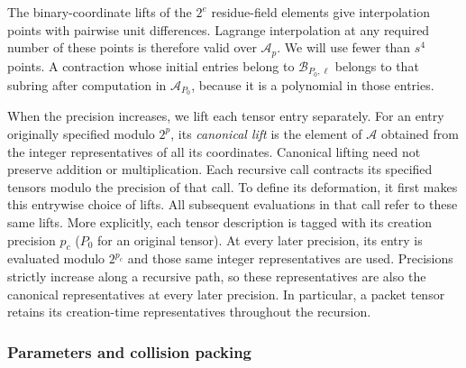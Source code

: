 The binary-coordinate lifts of the $2^e$ residue-field elements give
interpolation points with pairwise unit differences.  Lagrange
interpolation at any required number of these points is therefore
valid over $\mathcal A_p$.  We will use fewer than $s^4$ points.
A contraction whose initial entries belong to $\mathcal B_{P_0,\ell}$
belongs to that subring after computation in $\mathcal A_{P_0}$,
because it is a polynomial in those entries.

When the precision increases, we lift each tensor entry separately.
For an entry originally specified modulo $2^p$, its \emph{canonical
lift} is the element of $\mathcal A$ obtained from the integer
representatives of all its coordinates. Canonical lifting need not preserve
addition or multiplication. Each recursive call contracts its specified
tensors modulo the precision of that call.  To define its deformation,
it first makes this entrywise choice of lifts.  All subsequent
evaluations in that call refer to these same lifts.
More explicitly, each tensor description is tagged with its creation
precision $p_c$ ($P_0$ for an original tensor).  At every later
precision, its entry is evaluated modulo $2^{p_c}$ and those same
integer representatives are used.  Precisions strictly increase
along a recursive path, so these representatives are also the
canonical representatives at every later precision.  In particular,
a packet tensor retains its creation-time representatives throughout the recursion.

\subsubsection{Parameters and collision packing}
\label{subsec:tensor-packing}

